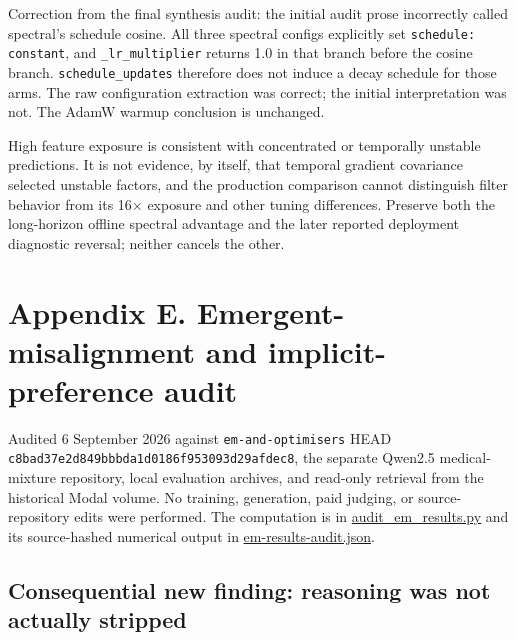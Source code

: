 \documentclass[
  british,
  10pt,
  a4paper,
]{article}
\begin{document}
Correction from the final synthesis audit: the initial audit prose
incorrectly called spectral's schedule cosine. All three spectral
configs explicitly set
\texttt{schedule:\allowbreak{} \allowbreak{}constant}, and
\texttt{\_\allowbreak{}lr\_\allowbreak{}multiplier} returns 1.0 in that
branch before the cosine branch. \texttt{schedule\_\allowbreak{}updates}
therefore does not induce a decay schedule for those arms. The raw
configuration extraction was correct; the initial interpretation was
not. The AdamW warmup conclusion is unchanged.

High feature exposure is consistent with concentrated or temporally
unstable predictions.\allowbreak{} It is not evidence, by itself, that
temporal gradient covariance selected unstable factors, and the
production comparison cannot distinguish filter behavior from its 16×
exposure and other tuning differences.\allowbreak{} Preserve both the
long-\allowbreak{}horizon offline spectral advantage and the later
reported deployment diagnostic reversal; neither cancels the other.

\clearpage

\section{\texorpdfstring{Appendix E.
Emergent-\allowbreak{}misalignment\allowbreak{} and
implicit-\allowbreak{}preference
audit}{Appendix E.  and  audit}}\label{em-results-audit}

Audited 6 September 2026 against
\texttt{em-\allowbreak{}and-\allowbreak{}optimisers} HEAD
\texttt{c8bad37e2d84\allowbreak{}9bbbda1d0186\allowbreak{}f953093d29af\allowbreak{}dec8},
the separate Qwen2.5 medical-\allowbreak{}mixture
repository,\allowbreak{} local evaluation archives, and read-only
retrieval from the historical Modal volume. No training,
generation,\allowbreak{} paid judging, or source-\allowbreak{}repository
edits were performed. The computation is in
\href{../audit/audit_em_results.py}{audit\_\allowbreak{}em\_\allowbreak{}results.\allowbreak{}py}
and its source-\allowbreak{}hashed numerical output in
\href{../audit/em-results-audit.json}{em-\allowbreak{}results-\allowbreak{}audit.\allowbreak{}json}.

\subsection{Consequential new finding: reasoning was not actually
stripped}\label{em-results-audit--consequential-new-finding-reasoning-was-not-actually-stripped}
\end{document}
